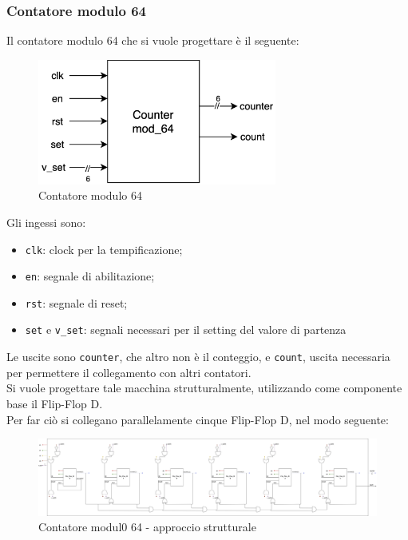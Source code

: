 \subsubsection{Contatore modulo 64}
Il contatore modulo 64 che si vuole progettare è il seguente:
\begin{figure}[H]
	\centering
	\includegraphics[width=0.7\textwidth]{img/counter_64}
	\caption{Contatore modulo 64}
	\label{cnt_64} 
\end{figure}
Gli ingessi sono:
\begin{itemize}
    \item \texttt{clk}: clock per la tempificazione;
    \item \texttt{en}: segnale di abilitazione;
    \item \texttt{rst}: segnale di reset;
    \item \texttt{set} e \texttt{v\_set}: segnali necessari per il setting del valore di partenza
\end{itemize}
Le uscite sono \texttt{counter}, che altro non è il conteggio, e \texttt{count}, uscita necessaria per permettere il collegamento con altri contatori.\\

\noindent Si vuole progettare tale macchina strutturalmente, utilizzando come componente base il Flip-Flop D.\\
Per far ciò si collegano parallelamente cinque Flip-Flop D, nel modo seguente:
\clearpage
\begin{figure}
	\centering
	\includegraphics[width=1\textwidth]{img/counter_mod_64_str.png}
	\caption{Contatore modul0 64 - approccio strutturale}
	\label{cnt_64_str} 
\end{figure}
\clearpage

